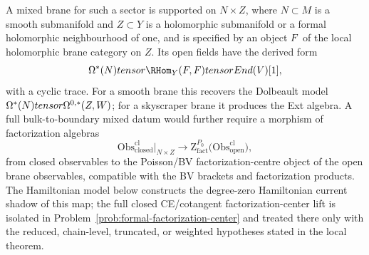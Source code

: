 \documentclass[11pt]{memoir}
\begin{document}
\begin{defn}
  A mixed brane for such a sector is supported on $N\times Z$, where
  $N\subset M$ is a smooth submanifold and $Z\subset Y$ is a holomorphic
  submanifold or a formal holomorphic neighbourhood of one, and is
  specified by an object $F$ of the local holomorphic brane category on
  $Z$. Its open fields have the derived form
  $$\Omega^*(N)\widehat{\otimes}\RHom_Y(\mc F,\mc F)\otimes\End(V)[1],$$
  with a cyclic trace. For a smooth brane this recovers the Dolbeault model
  $\Omega^*(N)tensor\Omega^{0,*}(Z,W)$; for a skyscraper
  brane it produces the Ext algebra. A full bulk-to-boundary mixed datum would
  further require a morphism of factorization algebras
  $$\mathrm{Obs}^{\mathrm{cl}}_{\mathrm{closed}}\big|_{N\times Z}
    \longrightarrow
    \mathrm Z^{P_0}_{\mathrm{fact}}\bigl(\mathrm{Obs}^{\mathrm{cl}}_{\mathrm{open}}\bigr),$$
  from closed observables to the Poisson/BV factorization-centre object of the
  open brane observables, compatible with the BV brackets and
  factorization products. The Hamiltonian model below constructs the
  degree-zero Hamiltonian current shadow of this map; the full closed
  CE/cotangent factorization-center lift is isolated in
  Problem~\ref{prob:formal-factorization-center} and treated there only
  with the reduced, chain-level, truncated, or weighted hypotheses stated
  in the local theorem.
\end{defn}
\end{document}
